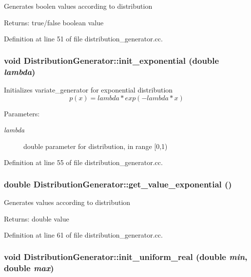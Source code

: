 Generates boolen values according to distribution \begin{Desc}
\item[Returns:]true/false boolean value \end{Desc}


Definition at line 51 of file distribution\_\-generator.cc.\hypertarget{class_distribution_generator_5204a1fa18cf090b2fe3891d4d3f7a07}{
\subsubsection[init\_\-exponential]{\setlength{\rightskip}{0pt plus 5cm}void DistributionGenerator::init\_\-exponential (double {\em lambda})}}
\label{class_distribution_generator_5204a1fa18cf090b2fe3891d4d3f7a07}


Initializes variate\_\-generator for exponential distribution \[ p(x) = lambda * exp(-lambda * x) \] \begin{Desc}
\item[Parameters:]
\begin{description}
\item[{\em lambda}]double parameter for distribution, in range \mbox{[}0,1) \end{description}
\end{Desc}


Definition at line 55 of file distribution\_\-generator.cc.\hypertarget{class_distribution_generator_217a1822a0f49680cbc8a32bb75ba687}{
\subsubsection[get\_\-value\_\-exponential]{\setlength{\rightskip}{0pt plus 5cm}double DistributionGenerator::get\_\-value\_\-exponential ()}}
\label{class_distribution_generator_217a1822a0f49680cbc8a32bb75ba687}


Generates values according to distribution \begin{Desc}
\item[Returns:]double value \end{Desc}


Definition at line 61 of file distribution\_\-generator.cc.\hypertarget{class_distribution_generator_2b293a6d907be3c3d182a1d8dc234fdf}{
\subsubsection[init\_\-uniform\_\-real]{\setlength{\rightskip}{0pt plus 5cm}void DistributionGenerator::init\_\-uniform\_\-real (double {\em min}, \/  double {\em max})}}
\label{class_distribution_generator_2b293a6d907be3c3d182a1d8dc234fdf}


